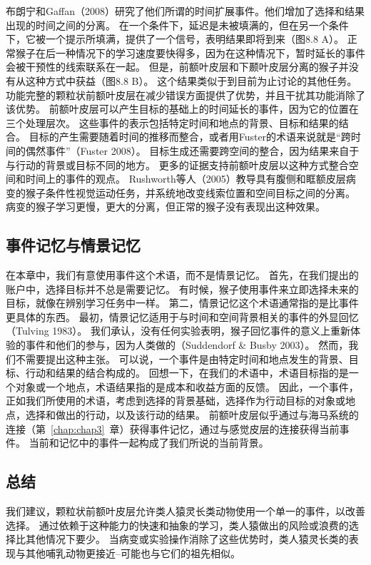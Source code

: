 布朗宁和Gaffan（2008）研究了他们所谓的时间扩展事件。他们增加了选择和结果出现的时间之间的分离。
在一个条件下，延迟是未被填满的，但在另一个条件下，它被一个提示所填满，提供了一个信号，表明结果即将到来（图8.8 A）。
正常猴子在后一种情况下的学习速度要快得多，因为在这种情况下，暂时延长的事件会被干预性的线索联系在一起。
但是，前额叶皮层和下颞叶皮层分离的猴子并没有从这种方式中获益（图8.8 B）。
这个结果类似于到目前为止讨论的其他任务。
功能完整的颗粒状前额叶皮层在减少错误方面提供了优势，并且干扰其功能消除了该优势。
前额叶皮层可以产生目标的基础上的时间延长的事件，因为它的位置在三个处理层次。
这些事件的表示包括特定时间和地点的背景、目标和结果的结合。
目标的产生需要随着时间的推移而整合，或者用Fuster的术语来说就是“跨时间的偶然事件”（Fuster 2008）。
目标生成还需要跨空间的整合，因为结果来自于与行动的背景或目标不同的地方。
更多的证据支持前额叶皮层以这种方式整合空间和时间上的事件的观点。
Rushworth等人（2005）教导具有腹侧和眶额皮层病变的猴子条件性视觉运动任务，并系统地改变线索位置和空间目标之间的分离。
病变的猴子学习更慢，更大的分离，但正常的猴子没有表现出这种效果。



\subsection{事件记忆与情景记忆}

在本章中，我们有意使用事件这个术语，而不是情景记忆。
首先，在我们提出的账户中，选择目标并不总是需要记忆。
有时候，猴子使用事件来立即选择未来的目标，就像在辨别学习任务中一样。
第二，情景记忆这个术语通常指的是比事件更具体的东西。
最初，情景记忆适用于与时间和空间背景相关的事件的外显回忆（Tulving 1983）。
我们承认，没有任何实验表明，猴子回忆事件的意义上重新体验的事件和他们的参与，因为人类做的（Suddendorf \& Busby 2003）。
然而，我们不需要提出这种主张。
可以说，一个事件是由特定时间和地点发生的背景、目标、行动和结果的结合构成的。
回想一下，在我们的术语中，术语目标指的是一个对象或一个地点，术语结果指的是成本和收益方面的反馈。
因此，一个事件，正如我们所使用的术语，考虑到选择的背景基础，选择作为行动目标的对象或地点，选择和做出的行动，以及该行动的结果。
前额叶皮层似乎通过与海马系统的连接（第~\ref{chap:chap3}~章）获得事件记忆，通过与感觉皮层的连接获得当前事件。
当前和记忆中的事件一起构成了我们所说的当前背景。



\subsection{总结}

我们建议，颗粒状前额叶皮层允许类人猿灵长类动物使用一个单一的事件，以改善选择。
通过依赖于这种能力的快速和抽象的学习，类人猿做出的风险或浪费的选择比其他情况下要少。
当病变或实验操作消除了这些优势时，类人猿灵长类的表现与其他哺乳动物更接近--可能也与它们的祖先相似。



